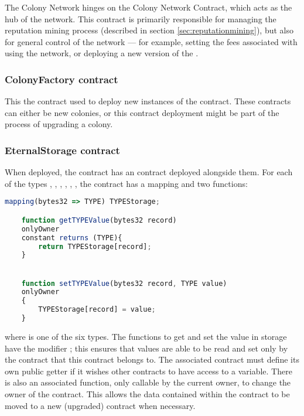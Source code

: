 The Colony Network hinges on the Colony Network Contract, which acts as the hub of the network. This contract is primarily responsible for managing the reputation mining process (described in section \ref{sec:reputationmining}), but also for general control of the network --- for example, setting the fees associated with using the network, or deploying a new version of the .

\subsubsection {ColonyFactory contract}
This the contract used to deploy new instances of the  contract. These contracts can either be new colonies, or this contract deployment might be part of the process of upgrading a colony.

\subsubsection {EternalStorage contract}

When deployed, the   contract has an  contract deployed alongside them. For each of the types , , , , , , the  contract has a mapping and two functions:

\begin{minipage}[c]{0.9\linewidth}
\begin{lstlisting}[language=JavaScript]
    mapping(bytes32 => TYPE) TYPEStorage;

    function getTYPEValue(bytes32 record)
    onlyOwner 
    constant returns (TYPE){
        return TYPEStorage[record];
    }


    function setTYPEValue(bytes32 record, TYPE value)
    onlyOwner
    {
        TYPEStorage[record] = value;
    }
\end{lstlisting}
\end{minipage}

\noindent where  is one of the six types. The functions to get and set the value in storage have the modifier ; this ensures that values are able to be read and set only by the contract that this  contract belongs to. The associated contract must define its own public getter if it wishes other contracts to have access to a variable. There is also an associated  function, only callable by the current owner, to change the owner of the contract. This allows the data contained within the contract to be moved to a new (upgraded) contract when necessary. 

